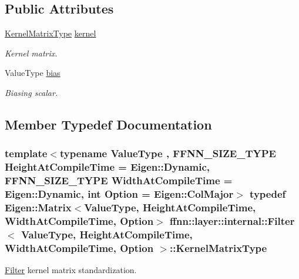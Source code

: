\subsection*{Public Attributes}
\begin{DoxyCompactItemize}
\item 
\hyperlink{structffnn_1_1layer_1_1internal_1_1_filter_a366f3c217c51cde60751c95a1fb67c27}{Kernel\-Matrix\-Type} \hyperlink{structffnn_1_1layer_1_1internal_1_1_filter_a4e768c6ca11ca77ce1373bf40e986e78}{kernel}
\begin{DoxyCompactList}\small\item\em Kernel matrix. \end{DoxyCompactList}\item 
Value\-Type \hyperlink{structffnn_1_1layer_1_1internal_1_1_filter_ad44b8b75e3dcdf5af8dc89ac73471376}{bias}
\begin{DoxyCompactList}\small\item\em Biasing scalar. \end{DoxyCompactList}\end{DoxyCompactItemize}


\subsection{Member Typedef Documentation}
\hypertarget{structffnn_1_1layer_1_1internal_1_1_filter_a366f3c217c51cde60751c95a1fb67c27}{
\subsubsection[{Kernel\-Matrix\-Type}]{\setlength{\rightskip}{0pt plus 5cm}template$<$typename Value\-Type , F\-F\-N\-N\-\_\-\-S\-I\-Z\-E\-\_\-\-T\-Y\-P\-E Height\-At\-Compile\-Time = Eigen\-::\-Dynamic, F\-F\-N\-N\-\_\-\-S\-I\-Z\-E\-\_\-\-T\-Y\-P\-E Width\-At\-Compile\-Time = Eigen\-::\-Dynamic, int Option = Eigen\-::\-Col\-Major$>$ typedef Eigen\-::\-Matrix$<$Value\-Type, Height\-At\-Compile\-Time, Width\-At\-Compile\-Time, Option$>$ {\bf ffnn\-::layer\-::internal\-::\-Filter}$<$ Value\-Type, Height\-At\-Compile\-Time, Width\-At\-Compile\-Time, Option $>$\-::{\bf Kernel\-Matrix\-Type}}}\label{structffnn_1_1layer_1_1internal_1_1_filter_a366f3c217c51cde60751c95a1fb67c27}


\hyperlink{structffnn_1_1layer_1_1internal_1_1_filter}{Filter} kernel matrix standardization. 

